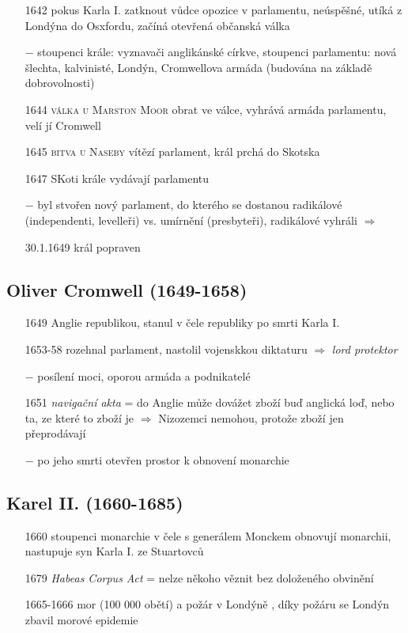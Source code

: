 \documentclass{article}
\begin{document}
\begin{itemize}
    \item[1642] pokus Karla I. zatknout vůdce opozice v parlamentu, neúspěšné, utíká z Londýna do Osxfordu, začíná otevřená občanská válka
    \item[$-$] stoupenci krále: vyznavači anglikánské církve, stoupenci parlamentu: nová šlechta, kalvinisté, Londýn, Cromwellova armáda (budována na základě dobrovolnosti)
    \item[1644] \textsc{válka u Marston Moor} obrat ve válce, vyhrává armáda parlamentu, velí jí Cromwell
    \item[1645] \textsc{bitva u Naseby} vítězí parlament, král prchá do Skotska
    \item[1647] SKoti krále vydávají parlamentu
    \item[$-$] byl stvořen nový parlament, do kterého se dostanou radikálové (independenti, levelleři) vs. umírnění (presbyteři), radikálové vyhráli $\Rightarrow$
    \item[30.1.1649] král popraven
\end{itemize}

\subsection*{Oliver Cromwell (1649-1658)}
\begin{itemize}
    \vspace{-0.5em}
    \setlength\itemsep{0.15em}
    \item[1649] Anglie republikou, stanul v čele republiky po smrti Karla I.
    \item[1653-58]  rozehnal parlament, nastolil vojenskkou diktaturu $\Rightarrow$ \textit{lord protektor}
    \item[$-$] posílení moci, oporou armáda a podnikatelé
    \item[1651] \textit{navigační akta} = do Anglie může dovážet zboží buď anglická loď, nebo ta, ze které to zboží je $\Rightarrow$ Nizozemci nemohou, protože zboží jen přeprodávají
    \item[$-$] po jeho smrti otevřen prostor k obnovení monarchie
\end{itemize}

\subsection*{Karel II. (1660-1685)}
\begin{itemize}
    \vspace{-0.5em}
    \setlength\itemsep{0.15em}
    \item[1660] stoupenci monarchie v čele s generálem Monckem obnovují monarchii, nastupuje syn Karla I. ze Stuartovců
    \item[1679] \textit{Habeas Corpus Act} = nelze někoho věznit bez doloženého obvinění
    \item[1665-1666] mor (100 000 obětí) a požár v Londýně , díky požáru se Londýn zbavil morové epidemie
\end{itemize}
\end{document}
